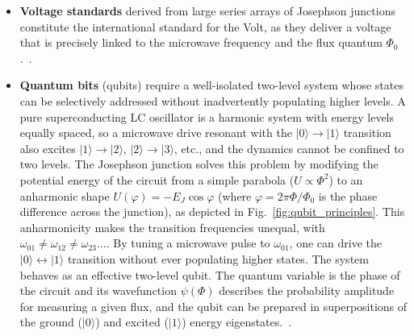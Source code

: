\documentclass[11pt,a4paper,twoside,openany]{report}
\begin{document}
\begin{itemize}
\begin{figure}[H]
\begin{minipage}[c]{0.52\textwidth}
        \label{fig:squid_modulation}
        \end{minipage}
        \caption{dc-SQUID principle.}
        \label{fig:squid}
        \end{figure}
    \item \textbf{Voltage standards} derived from large series arrays of Josephson junctions constitute the international standard for the Volt, as they deliver a voltage that is precisely linked to the microwave frequency and the flux quantum \(\Phi_0\).~\cite{hamilton_josephson_1997}.
   \item \textbf{Quantum bits} (qubits) require a well-isolated two-level system whose states can be selectively addressed without inadvertently populating higher levels. A pure superconducting LC oscillator is a harmonic system with energy levels equally spaced, so a microwave drive resonant with the \(|0\rangle\!\to\!|1\rangle\) transition also excites \(|1\rangle\!\to\!|2\rangle\), \(|2\rangle\!\to\!|3\rangle\), etc., and the dynamics cannot be confined to two levels. The Josephson junction solves this problem by modifying the potential energy of the circuit from a simple parabola (\(U\propto\Phi^{2}\)) to an anharmonic shape \(U(\varphi)=-E_J\cos\varphi\) (where \(\varphi=2\pi\Phi/\Phi_0\) is the phase difference across the junction), as depicted in Fig.~\ref{fig:qubit_principles}. This anharmonicity makes the transition frequencies unequal, with \(\omega_{01}\neq\omega_{12}\neq\omega_{23}\ldots\). By tuning a microwave pulse to \(\omega_{01}\), one can drive the \(|0\rangle\leftrightarrow|1\rangle\) transition without ever populating higher states. The system behaves as an effective two-level qubit. The quantum variable is the phase of the circuit and its wavefunction \(\psi(\Phi)\) describes the probability amplitude for measuring a given flux, and the qubit can be prepared in superpositions of the
  ground (\(|0\rangle\)) and excited (\(|1\rangle\)) energy eigenstates.~\cite{devoret2013superconducting}.

\end{itemize}
\end{document}
